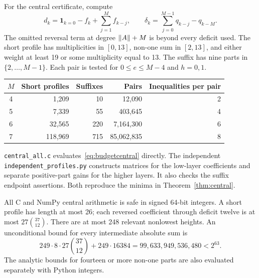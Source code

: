 For the central certificate, compute
\[
 d_k=\mathbf1_{k=0}-f_k+\sum_{j=1}^Mf_{k-j},\qquad
 \delta_k=\sum_{j=0}^{M-1}q_{k-j}-q_{k-M}.
\]
The omitted reversal term at degree $\lVert A\rVert+M$ is beyond every deficit used. The short profile has multiplicities in $[0,13]$, non-one sum in $[2,13]$, and either weight at least 19 or some multiplicity equal to 13. The suffix has nine parts in $\{2,\ldots,M-1\}$. Each pair is tested for $0\le e\le M-4$ and $h=0,1$.
\begin{center}
\begin{tabular}{crrrr}\toprule
$M$ & Short profiles & Suffixes & Pairs & Inequalities per pair\\\midrule
4&1,209&10&12,090&2\\
5&7,339&55&403,645&4\\
6&32,565&220&7,164,300&6\\
7&118,969&715&85,062,835&8\\\bottomrule
\end{tabular}
\end{center}
\texttt{central\_all.c} evaluates~\eqref{eq:budgetcentral} directly. The independent \texttt{independent\_profiles.py} constructs matrices for the low-layer coefficients and separate positive-part gains for the higher layers. It also checks the suffix endpoint assertions. Both reproduce the minima in Theorem~\ref{thm:central}.

All C and NumPy central arithmetic is safe in signed 64-bit integers. A short profile has length at most 26; each reversed coefficient through deficit twelve is at most $27\binom{37}{12}$. There are at most 248 relevant nonlowest heights. An unconditional bound for every intermediate absolute sum is
\[
 249\cdot8\cdot27\binom{37}{12}+249\cdot16384
 =99,633,949,536,480<2^{63}.
\]
The analytic bounds for fourteen or more non-one parts are also evaluated separately with Python integers.

